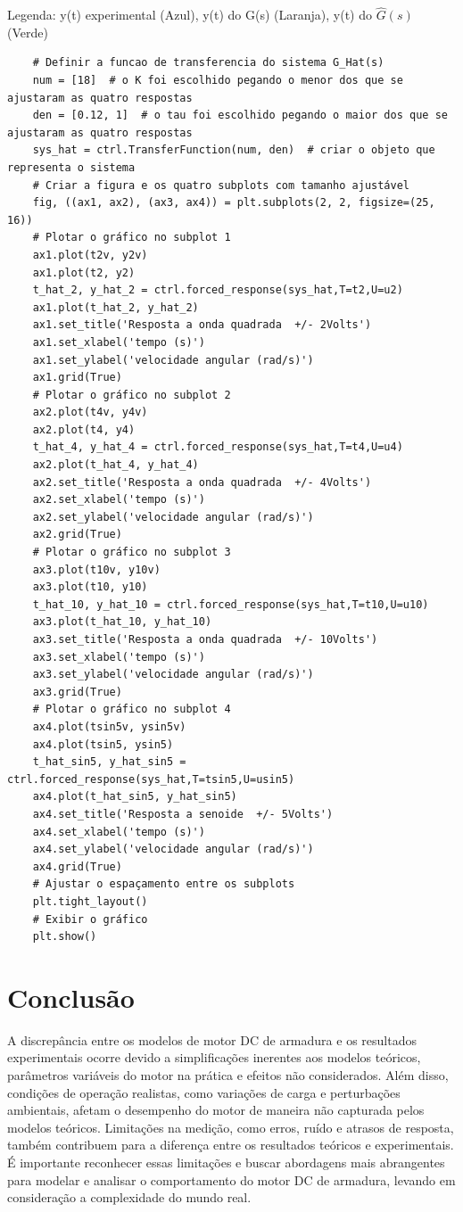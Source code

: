 \documentclass[10pt]{article}
\begin{document}
\quad Legenda: y(t) experimental (Azul), y(t) do G(s) (Laranja), y(t) do $\hat{G}(s)$ (Verde)

\begin{verbatim}
    # Definir a funcao de transferencia do sistema G_Hat(s)
    num = [18]  # o K foi escolhido pegando o menor dos que se ajustaram as quatro respostas
    den = [0.12, 1]  # o tau foi escolhido pegando o maior dos que se ajustaram as quatro respostas
    sys_hat = ctrl.TransferFunction(num, den)  # criar o objeto que representa o sistema
    # Criar a figura e os quatro subplots com tamanho ajustável
    fig, ((ax1, ax2), (ax3, ax4)) = plt.subplots(2, 2, figsize=(25, 16))
    # Plotar o gráfico no subplot 1
    ax1.plot(t2v, y2v)
    ax1.plot(t2, y2)
    t_hat_2, y_hat_2 = ctrl.forced_response(sys_hat,T=t2,U=u2)
    ax1.plot(t_hat_2, y_hat_2)
    ax1.set_title('Resposta a onda quadrada  +/- 2Volts')
    ax1.set_xlabel('tempo (s)')
    ax1.set_ylabel('velocidade angular (rad/s)')
    ax1.grid(True)
    # Plotar o gráfico no subplot 2
    ax2.plot(t4v, y4v)
    ax2.plot(t4, y4)
    t_hat_4, y_hat_4 = ctrl.forced_response(sys_hat,T=t4,U=u4)
    ax2.plot(t_hat_4, y_hat_4)
    ax2.set_title('Resposta a onda quadrada  +/- 4Volts')
    ax2.set_xlabel('tempo (s)')
    ax2.set_ylabel('velocidade angular (rad/s)')
    ax2.grid(True)
    # Plotar o gráfico no subplot 3
    ax3.plot(t10v, y10v)
    ax3.plot(t10, y10)
    t_hat_10, y_hat_10 = ctrl.forced_response(sys_hat,T=t10,U=u10)
    ax3.plot(t_hat_10, y_hat_10)
    ax3.set_title('Resposta a onda quadrada  +/- 10Volts')
    ax3.set_xlabel('tempo (s)')
    ax3.set_ylabel('velocidade angular (rad/s)')
    ax3.grid(True)
    # Plotar o gráfico no subplot 4
    ax4.plot(tsin5v, ysin5v)
    ax4.plot(tsin5, ysin5)
    t_hat_sin5, y_hat_sin5 = ctrl.forced_response(sys_hat,T=tsin5,U=usin5)
    ax4.plot(t_hat_sin5, y_hat_sin5)
    ax4.set_title('Resposta a senoide  +/- 5Volts')
    ax4.set_xlabel('tempo (s)')
    ax4.set_ylabel('velocidade angular (rad/s)')
    ax4.grid(True)
    # Ajustar o espaçamento entre os subplots
    plt.tight_layout()
    # Exibir o gráfico
    plt.show()
\end{verbatim}

\section{Conclusão}

\quad A discrepância entre os modelos de motor DC de armadura e os resultados experimentais ocorre devido a simplificações inerentes aos modelos teóricos, parâmetros variáveis do motor na prática e efeitos não considerados.
Além disso, condições de operação realistas, como variações de carga e perturbações ambientais,
afetam o desempenho do motor de maneira não capturada pelos modelos teóricos.
Limitações na medição, como erros, ruído e atrasos de resposta,
também contribuem para a diferença entre os resultados teóricos e experimentais.
É importante reconhecer essas limitações e buscar abordagens mais abrangentes para modelar e analisar o comportamento do motor DC de armadura,
levando em consideração a complexidade do mundo real.
\end{document}

